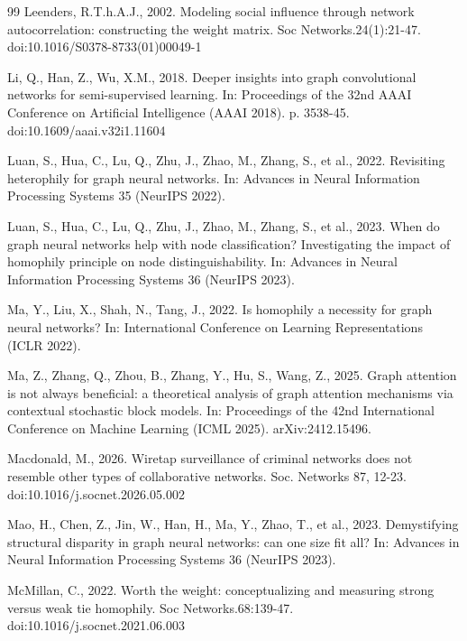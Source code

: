 \documentclass[preprint,12pt,authoryear]{elsarticle}
\theoremstyle{definition}
\begin{document}
\begin{thebibliography}{99}
Leenders, R.T.h.A.J., 2002. Modeling social influence through network autocorrelation: constructing the weight matrix. Soc Networks.24(1):21-47. doi:10.1016/S0378-8733(01)00049-1

Li, Q., Han, Z., Wu, X.M., 2018. Deeper insights into graph convolutional networks for semi-supervised learning. In: Proceedings of the 32nd AAAI Conference on Artificial Intelligence (AAAI 2018). p. 3538-45. doi:10.1609/aaai.v32i1.11604

Luan, S., Hua, C., Lu, Q., Zhu, J., Zhao, M., Zhang, S., et al., 2022. Revisiting heterophily for graph neural networks. In: Advances in Neural Information Processing Systems 35 (NeurIPS 2022).

Luan, S., Hua, C., Lu, Q., Zhu, J., Zhao, M., Zhang, S., et al., 2023. When do graph neural networks help with node classification? Investigating the impact of homophily principle on node distinguishability. In: Advances in Neural Information Processing Systems 36 (NeurIPS 2023).

Ma, Y., Liu, X., Shah, N., Tang, J., 2022. Is homophily a necessity for graph neural networks? In: International Conference on Learning Representations (ICLR 2022).

Ma, Z., Zhang, Q., Zhou, B., Zhang, Y., Hu, S., Wang, Z., 2025. Graph attention is not always beneficial: a theoretical analysis of graph attention mechanisms via contextual stochastic block models. In: Proceedings of the 42nd International Conference on Machine Learning (ICML 2025). arXiv:2412.15496.

Macdonald, M., 2026. Wiretap surveillance of criminal networks does not resemble other types of collaborative networks. Soc. Networks 87, 12-23. doi:10.1016/j.socnet.2026.05.002

Mao, H., Chen, Z., Jin, W., Han, H., Ma, Y., Zhao, T., et al., 2023. Demystifying structural disparity in graph neural networks: can one size fit all? In: Advances in Neural Information Processing Systems 36 (NeurIPS 2023).

McMillan, C., 2022. Worth the weight: conceptualizing and measuring strong versus weak tie homophily. Soc Networks.68:139-47. doi:10.1016/j.socnet.2021.06.003


\end{thebibliography}
\end{document}
